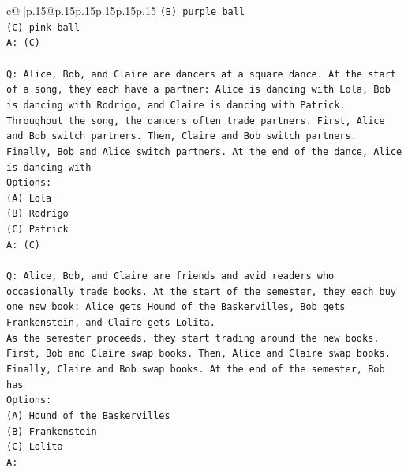 \documentclass{article}
\begin{document}
{\begin{supertabular}{c@{$\;$}|p{.15\linewidth}@{}p{.15\linewidth}p{.15\linewidth}p{.15\linewidth}p{.15\linewidth}p{.15\linewidth}}
{{{\texttt{(B) purple ball} \\
\texttt{(C) pink ball} \\
\texttt{A: (C)} \\
\\ 
\texttt{Q: Alice, Bob, and Claire are dancers at a square dance. At the start of a song, they each have a partner: Alice is dancing with Lola, Bob is dancing with Rodrigo, and Claire is dancing with Patrick.} \\
\texttt{Throughout the song, the dancers often trade partners. First, Alice and Bob switch partners. Then, Claire and Bob switch partners. Finally, Bob and Alice switch partners. At the end of the dance, Alice is dancing with} \\
\texttt{Options:} \\
\texttt{(A) Lola} \\
\texttt{(B) Rodrigo} \\
\texttt{(C) Patrick} \\
\texttt{A: (C)} \\
\\ 
\texttt{Q: Alice, Bob, and Claire are friends and avid readers who occasionally trade books. At the start of the semester, they each buy one new book: Alice gets Hound of the Baskervilles, Bob gets Frankenstein, and Claire gets Lolita.} \\
\texttt{As the semester proceeds, they start trading around the new books. First, Bob and Claire swap books. Then, Alice and Claire swap books. Finally, Claire and Bob swap books. At the end of the semester, Bob has} \\
\texttt{Options:} \\
\texttt{(A) Hound of the Baskervilles} \\
\texttt{(B) Frankenstein} \\
\texttt{(C) Lolita} \\
\texttt{A:} \\
            }
        }
    }
     \\ \\


\end{supertabular}}
\end{document}
